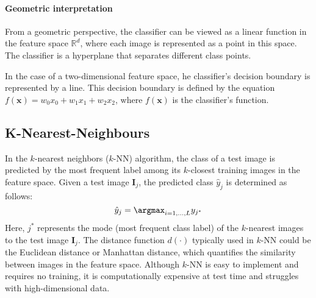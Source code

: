 \paragraph*{Geometric interpretation}
From a geometric perspective, the classifier can be viewed as a linear function in the feature space $\mathbb{R}^d$, where each image is represented as a point in this space. 
The classifier is a hyperplane that separates different class points.

In the case of a two-dimensional feature space, he classifier's decision boundary is represented by a line. 
This decision boundary is defined by the equation $f(\mathbf{x})=w_0x_0+w_1x_1+w_2x_2$, where $f(\mathbf{x})$ is the classifier's function.

\subsection{K-Nearest-Neighbours}
In the $k$-nearest neighbors ($k$-NN) algorithm, the class of a test image is predicted by the most frequent label among its $k$-closest training images in the feature space.
Given a test image $\mathbf{I}_j$, the predicted class $\hat{y}_j$ is determined as follows:
\[\hat{y}_j=\argmax_{i=1,\dots,L}y_{j^\ast}\]
Here, $j^\ast$ represents the mode (most frequent class label) of the $k$-nearest images to the test image $\mathbf{I}_j$. 
The distance function $d(\cdot)$ typically used in $k$-NN could be the Euclidean distance or Manhattan distance, which quantifies the similarity between images in the feature space.
Although $k$-NN is easy to implement and requires no training, it is computationally expensive at test time and struggles with high-dimensional data.

